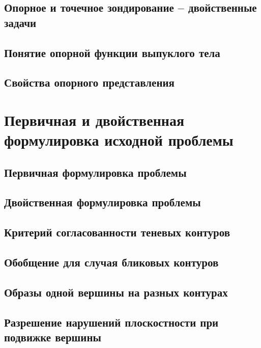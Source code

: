 \documentclass[a4paper, 12pt, titlepage]{article}
\theoremstyle{definition}
\theoremstyle{plain}
\theoremstyle{plain}
\begin{document}
\subsection{Опорное и точечное зондирование -- двойственные задачи}

\subsection{Понятие опорной функции выпуклого тела}

\subsection{Свойства опорного представления}


\section{Первичная и двойственная формулировка исходной проблемы}

\subsection{Первичная формулировка проблемы}

\subsection{Двойственная формулировка проблемы}

\subsection{Критерий согласованности теневых контуров}

\subsection{Обобщение для случая бликовых контуров}

\subsection{Образы одной вершины на разных контурах}

\subsection{Разрешение нарушений плоскостности при подвижке вершины}
\end{document}
